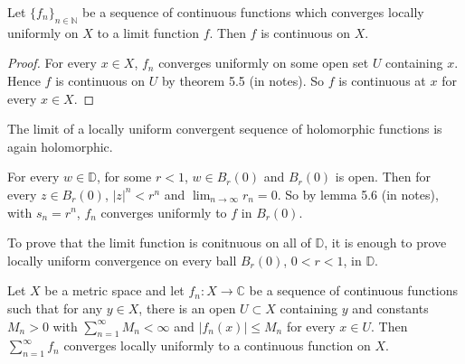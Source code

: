 \begin{theorem}
	Let ${\{f_n\}}_{n \in \mathbb{N}}$ be a sequence of continuous functions which converges locally uniformly on $X$ to a limit function $f$. Then $f$ is continuous on $X$.
\end{theorem}

\begin{proof}
	For every $x \in X$, $f_n$ converges uniformly on some open set $U$ containing $x$. Hence $f$ is continuous on $U$ by theorem 5.5 (in notes). So $f$ is continuous at $x$ for every $x \in X$.
\end{proof}

\begin{remark}
	The limit of a locally uniform convergent sequence of holomorphic functions is again holomorphic.
\end{remark}

\begin{example}
	For every $w \in \mathbb{D}$, for some $r < 1$, $w \in B_r(0)$ and $B_r(0)$ is open. Then for every $z \in B_r(0)$, $|z|^n < r^n$ and $\lim_{n \rightarrow \infty} r_n = 0$. So by lemma 5.6 (in notes), with $s_n = r^n$, $f_n$ converges uniformly to $f$ in $B_r(0)$.
\end{example}

\begin{remark}
	To prove that the limit function is conitnuous on all of $\mathbb{D}$, it is enough to prove locally uniform convergence on every ball $B_r(0)$, $0 < r < 1$, in $\mathbb{D}$.
\end{remark}

\begin{theorem}
	Let $X$ be a metric space and let $f_n: X \rightarrow \mathbb{C}$ be a sequence of continuous functions such that for any $y \in X$, there is an open $U \subset X$ containing $y$ and constants $M_n > 0$ with $\sum_{n = 1}^{\infty} M_n < \infty$ and $|f_n(x)| \le M_n$ for every $x \in U$. Then $\sum_{n = 1}^{\infty} f_n$ converges locally uniformly to a continuous function on $X$.
\end{theorem}

